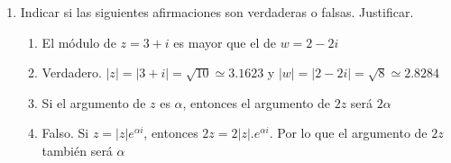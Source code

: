 \documentclass[a4paper]{article}
\newcommand{\answer}{\item[**]}
\newcommand{\exercise}{\item}
\newcommand{\df}[2]{\displaystyle\frac{#1}{#2}}
\begin{document}
\begin{enumerate}
\begin{multicols}{2}
\begin{enumerate} [label=(\alph*)]
		\item $\df{1}{(2+2i)^7}$
		\answer $8^{-\frac{7}{2}} e^{\frac{\pi}{4}i}$. \href{https://youtu.be/5ET1IAoQNdc}{Resolución}

		\item $\df{(\sqrt{3}+i)^4}{(-1+\sqrt{3}i)^6}$
		\answer $-\df{1}{8}+\df{3}{8}i$. \href{https://youtu.be/xveCBuIad3s}{Resolución}

		\item $\df{(1+i)^4}{(-1-i)^6}$
		\answer $2^{\frac{75}{2}} e^{\frac{7\pi}{4}i}$. \href{https://youtu.be/fyrIGxGpW8g}{Resolución}

		\item $\sqrt[3]{2\sqrt{3}+2i}$ (las raíces cúbicas de $2\sqrt{3}+2i$)
		\answer \href{https://youtu.be/5Z0cwrDtvzU}{Resolución}

		\item $\sqrt[5]{-\sqrt{3}i-1}$ (las raíces quintas de $-\sqrt{3}i-1$)
		\answer \href{https://youtu.be/egki90qZmjQ}{Resolución}

		\item $\sqrt[4]{-\df{\sqrt{3}}{2}i+\df{1}{2}}$ (las raíces cuartas de $-\df{\sqrt{3}}{2}i+\df{1}{2}$)
		\answer \href{https://youtu.be/GuqxEvxgHkQ}{Resolución}

		\item $\sqrt[3]{-1-i\sqrt{3}}$ (las raíces cúbicas de $-1-i\sqrt{3}$)
		\answer \href{https://youtu.be/x1KOtRgsRrg}{Resolución}

		\item $\sqrt[5]{-1+\sqrt{3}i}$ (las raíces quintas de $-1+\sqrt{3}i$)
		\answer \href{https://youtu.be/Be6upizltaE}{Resolución}


	\end{enumerate}
	\end{multicols}

	\exercise Indicar si las siguientes afirmaciones son verdaderas o falsas. Justificar.
	\begin{enumerate} [label=(\alph*)]
		
		\item El módulo de $z=3+i$ es mayor que el de $w=2-2i$
		\answer Verdadero. $|z|=|3+i|=\sqrt{10} \simeq 3.1623$ y $|w|=|2-2i|=\sqrt{8} \simeq 2.8284$

		\item Si el argumento de $z$ es $\alpha$, entonces el argumento de $2z$ será $2\alpha$
		\answer Falso. Si $z=|z|e^{\alpha i}$, entonces $2z=2|z|.e^{\alpha i}$. Por lo que el argumento de $2z$ también será $\alpha$


\end{enumerate}
\end{enumerate}
\end{document}
